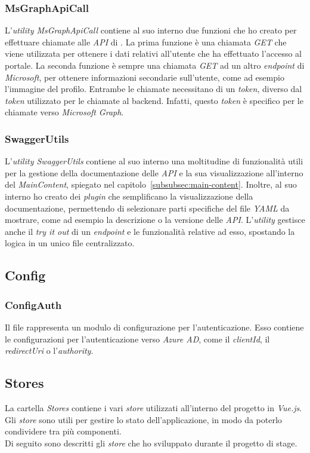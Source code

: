 \subsubsection{MsGraphApiCall}\label{subsubsec:ms-graph-api-call}
L'\textit{utility MsGraphApiCall} contiene al suo interno due funzioni che ho creato per effettuare chiamate alle \textit{API} di . 
La prima funzione è una chiamata \textit{GET} che viene utilizzata per ottenere i dati relativi all'utente che ha effettuato l'accesso al portale.
La seconda funzione è sempre una chiamata \textit{GET} ad un altro \textit{endpoint} di \textit{Microsoft}, per ottenere informazioni secondarie sull'utente, come ad esempio l'immagine del profilo.
Entrambe le chiamate necessitano di un \textit{token}, diverso dal \textit{token} utilizzato per le chiamate al backend. Infatti, questo \textit{token} è specifico per le chiamate verso \textit{Microsoft Graph}.

\subsubsection{SwaggerUtils}\label{subsubsec:swagger-utils}
L'\textit{utility SwaggerUtils} contiene al suo interno una moltitudine di funzionalità utili per la gestione della documentazione delle \textit{API} e la sua visualizzazione all'interno
del \textit{MainContent}, spiegato nel capitolo~\ref{subsubsec:main-content}.
Inoltre, al suo interno ho creato dei \textit{plugin} che semplificano la visualizzazione della documentazione, permettendo di selezionare parti specifiche del file \textit{YAML} da mostrare, come ad esempio la descrizione o la versione delle \textit{API}.
L'\textit{utility} gestisce anche il \textit{try it out} di un \textit{endpoint} e le funzionalità relative ad esso, spostando la logica in un unico file centralizzato.
\subsection{Config}\label{subsec:config}
\subsubsection{ConfigAuth}\label{subsubsec:config-auth}
Il file rappresenta un modulo di configurazione per l'autenticazione. Esso contiene le configurazioni per l'autenticazione verso \textit{Azure AD},
come il \textit{clientId}, il \textit{redirectUri} o l'\textit{authority}.  

\subsection{Stores}\label{subsec:store}
La cartella \textit{Stores} contiene i vari \textit{store} utilizzati all'interno del progetto in \textit{Vue.js}. Gli \textit{store} sono utili per gestire lo stato dell'applicazione,
in modo da poterlo condividere tra più componenti.\\
Di seguito sono descritti gli \textit{store} che ho sviluppato durante il progetto di stage.

